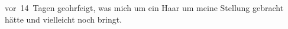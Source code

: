                   vor 14 Tagen geohrfeigt, was mich um ein Haar um meine Stellung gebracht hätte und
                  vielleicht noch bringt.\pend
           \endnumbering{}  
      